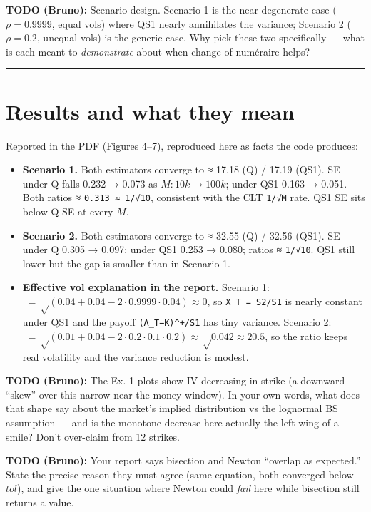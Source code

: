 \documentclass[
  11pt,
]{article}
\providecommand{\tightlist}{%
  \setlength{\itemsep}{0pt}\setlength{\parskip}{0pt}}
\begin{document}
\textbf{TODO (Bruno):} Scenario design. Scenario 1 is the
near-degenerate case (\(ρ=0.9999\), equal vols) where QS1 nearly
annihilates the variance; Scenario 2 (\(ρ=0.2\), unequal vols) is the
generic case. Why pick these two specifically --- what is each meant to
\emph{demonstrate} about when change-of-numéraire helps?

\begin{center}\rule{0.5\linewidth}{0.5pt}\end{center}

\hypertarget{results-and-what-they-mean}{%
\section{Results and what they mean}\label{results-and-what-they-mean}}

Reported in the PDF (Figures 4--7), reproduced here as facts the code
produces:

\begin{itemize}
\tightlist
\item
  \textbf{Scenario 1.} Both estimators converge to ≈ 17.18 (Q) / 17.19
  (QS1). SE under Q falls 0.232 → 0.073 as \(M: 10k → 100k\); under QS1
  0.163 → 0.051. Both ratios ≈ \texttt{0.313\ ≈\ 1/√10}, consistent with
  the CLT \texttt{1/√M} rate. QS1 SE sits below Q SE at every \(M\).
\item
  \textbf{Scenario 2.} Both estimators converge to ≈ 32.55 (Q) / 32.56
  (QS1). SE under Q 0.305 → 0.097; under QS1 0.253 → 0.080; ratios ≈
  \texttt{1/√10}. QS1 still lower but the gap is smaller than in
  Scenario 1.
\item
  \textbf{Effective vol explanation in the report.} Scenario 1:
  \( = √(0.04+0.04−2·0.9999·0.04) ≈ 0\), so \texttt{X\_T\ =\ S2/S1} is
  nearly constant under QS1 and the payoff \texttt{(A\_T−K)\^{}+/S1} has
  tiny variance. Scenario 2:
  \( = √(0.01+0.04−2·0.2·0.1·0.2) ≈ √0.042 ≈ 20.5%
  \), so the ratio keeps real volatility and the variance reduction is
  modest.
\end{itemize}

\textbf{TODO (Bruno):} The Ex. 1 plots show IV decreasing in strike (a
downward ``skew'' over this narrow near-the-money window). In your own
words, what does that shape say about the market's implied distribution
vs the lognormal BS assumption --- and is the monotone decrease here
actually the left wing of a smile? Don't over-claim from 12 strikes.

\textbf{TODO (Bruno):} Your report says bisection and Newton ``overlap
as expected.'' State the precise reason they must agree (same equation,
both converged below \(tol\)), and give the one situation where Newton
could \emph{fail} here while bisection still returns a value.
\end{document}
